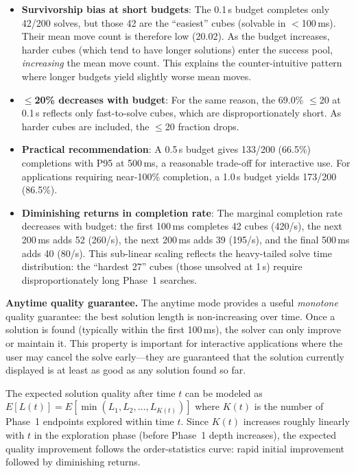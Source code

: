 \documentclass[conference]{IEEEtran}
\begin{document}
\begin{itemize}[leftmargin=*]
  \item \textbf{Survivorship bias at short budgets}: The 0.1\,s budget completes only 42/200 solves, but those 42 are the ``easiest'' cubes (solvable in $<$100\,ms). Their mean move count is therefore low (20.02). As the budget increases, harder cubes (which tend to have longer solutions) enter the success pool, \emph{increasing} the mean move count. This explains the counter-intuitive pattern where longer budgets yield slightly worse mean moves.
  
  \item \textbf{$\leq$20\% decreases with budget}: For the same reason, the 69.0\% $\leq$20 at 0.1\,s reflects only fast-to-solve cubes, which are disproportionately short. As harder cubes are included, the $\leq$20 fraction drops.
  
  \item \textbf{Practical recommendation}: A 0.5\,s budget gives 133/200 (66.5\%) completions with P95 at 500\,ms, a reasonable trade-off for interactive use. For applications requiring near-100\% completion, a 1.0\,s budget yields 173/200 (86.5\%).
  
  \item \textbf{Diminishing returns in completion rate}: The marginal completion rate decreases with budget: the first 100\,ms completes 42 cubes (420/s), the next 200\,ms adds 52 (260/s), the next 200\,ms adds 39 (195/s), and the final 500\,ms adds 40 (80/s). This sub-linear scaling reflects the heavy-tailed solve time distribution: the ``hardest 27'' cubes (those unsolved at 1\,s) require disproportionately long Phase~1 searches.
\end{itemize}

\textbf{Anytime quality guarantee.} The anytime mode provides a useful \emph{monotone} quality guarantee: the best solution length is non-increasing over time. Once a solution is found (typically within the first 100\,ms), the solver can only improve or maintain it. This property is important for interactive applications where the user may cancel the solve early---they are guaranteed that the solution currently displayed is at least as good as any solution found so far.

The expected solution quality after time $t$ can be modeled as $E[L(t)] = E[\min(L_1, L_2, \ldots, L_{K(t)})]$ where $K(t)$ is the number of Phase~1 endpoints explored within time $t$. Since $K(t)$ increases roughly linearly with $t$ in the exploration phase (before Phase~1 depth increases), the expected quality improvement follows the order-statistics curve: rapid initial improvement followed by diminishing returns.
\end{document}
